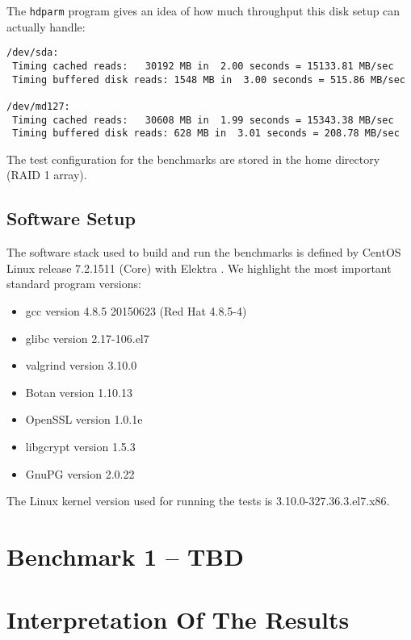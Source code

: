The \texttt{hdparm} program gives an idea of how much throughput this disk setup can actually handle:

\begin{lstlisting}[caption={Disk performance on the benchmark machine}]
/dev/sda:
 Timing cached reads:   30192 MB in  2.00 seconds = 15133.81 MB/sec
 Timing buffered disk reads: 1548 MB in  3.00 seconds = 515.86 MB/sec

/dev/md127:
 Timing cached reads:   30608 MB in  1.99 seconds = 15343.38 MB/sec
 Timing buffered disk reads: 628 MB in  3.01 seconds = 208.78 MB/sec
\end{lstlisting}

The test configuration for the benchmarks are stored in the home directory (RAID 1 array).

  \subsection{Software Setup}

The software stack used to build and run the benchmarks is defined by CentOS Linux release 7.2.1511 (Core) with Elektra .
We highlight the most important standard program versions:

\begin{itemize}
  \item gcc version 4.8.5 20150623 (Red Hat 4.8.5-4)
  \item glibc version 2.17-106.el7
  \item valgrind version 3.10.0
  \item Botan version 1.10.13
  \item OpenSSL version 1.0.1e
  \item libgcrypt version 1.5.3
  \item GnuPG version 2.0.22
\end{itemize}

The Linux kernel version used for running the tests is 3.10.0-327.36.3.el7.x86.

\section{Benchmark 1 -- TBD}

\section{Interpretation Of The Results}
